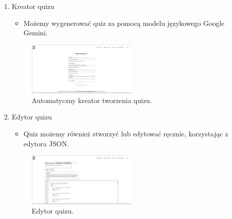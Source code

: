 \documentclass{article}
\begin{document}
\begin{enumerate}
        \item Kreator quizu \\
        \begin{minipage}{0.4\textwidth}
          \begin{itemize}
            \item Możemy wygenerować quiz za pomocą modelu językowego Google Gemini.
          \end{itemize}
        \end{minipage}
        \begin{minipage}{0.6\textwidth}
          \begin{figure}[H]
            \centering
            \includegraphics[width=0.5\textwidth]{../_assets/web/createAi.png}
            \caption{Automatyczny kreator tworzenia quizu.}
            \label{fig:createAi}
          \end{figure}
        \end{minipage}

		\item Edytor quizu \\
        \begin{minipage}{0.4\textwidth}
          \begin{itemize}
            \item Quiz możemy również stworzyć lub edytować ręcznie, korzystając z edytora JSON.
          \end{itemize}
        \end{minipage}
        \begin{minipage}{0.6\textwidth}
          \begin{figure}[H]
            \centering
            \includegraphics[width=0.5\textwidth]{../_assets/web/edit.png}
            \caption{Edytor quizu.}
            \label{fig:edit}
          \end{figure}
        \end{minipage}


\end{enumerate}
\end{document}

